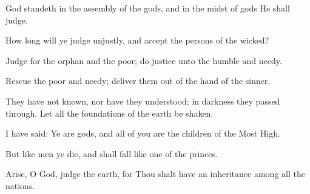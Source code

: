God standeth in the assembly of the gods, and in the midst of gods He shall judge.

How long will ye judge unjustly, and accept the persons of the wicked?

Judge for the orphan and the poor; do justice unto the humble and needy.

Rescue the poor and needy; deliver them out of the hand of the sinner.

They have not known, nor have they understood; in darkness they passed through. Let all the foundations of the earth be shaken.

I have said: Ye are gods, and all of you are the children of the Most High.

But like men ye die, and shall fall like one of the princes.

Arise, O God, judge the earth, for Thou shalt have an inheritance among all the nations.
